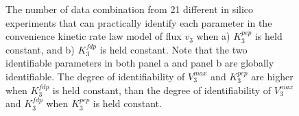\documentclass[10pt]{article}
\begin{document}
	\begin{figure}[!tbhp]
		\caption{The number of data combination from 21 different in silico experiments that can practically identify each parameter in the convenience kinetic rate law model of flux $v_3$ when a) $K_3^{pep}$ is held constant, and b) $K_3^{fdp}$ is held constant. Note that the two identifiable parameters in both panel a and panel b are globally identifiable. The degree of identifiability of $V_3^{max}$ and $K_3^{pep}$ are higher when $K_3^{fdp}$ is held constant, than the degree of identifiability of $V_3^{max}$ and $K_3^{fdp}$ when $K_3^{pep}$ is held constant.}\label{fig:ident_v3_var}
	\end{figure} 
	
\end{document}
